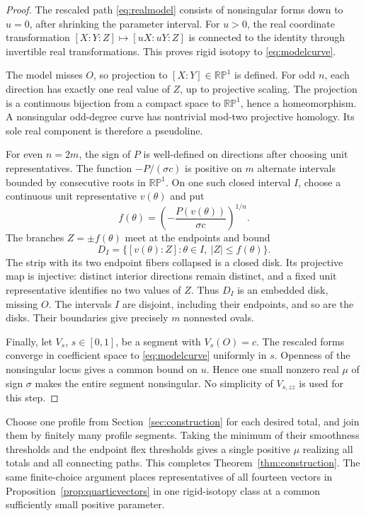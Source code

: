 \documentclass[11pt,a4paper]{article}
\theoremstyle{remark}
\newcommand{\RP}{\mathbb {RP}}
\begin{document}
\begin{proof}
The rescaled path \eqref{eq:realmodel} consists of nonsingular
forms down to \(u=0\), after shrinking the parameter interval.
For \(u>0\), the real coordinate transformation
\([X:Y:Z]\mapsto[uX:uY:Z]\) is connected to the identity through
invertible real transformations. This proves rigid isotopy to
\eqref{eq:modelcurve}.

The model misses \(O\), so projection to \([X:Y]\in\RP^1\)
is defined. For odd \(n\), each direction has exactly one real
value of \(Z\), up to projective scaling. The projection is a
continuous bijection from a compact space to \(\RP^1\), hence a
homeomorphism. A nonsingular odd-degree curve has nontrivial
mod-two projective homology. Its sole real component is therefore
a pseudoline.

For even \(n=2m\), the sign of \(P\) is well-defined on directions
after choosing unit representatives. The function
\(-P/(\sigma c)\) is positive on \(m\) alternate intervals bounded
by consecutive roots in \(\RP^1\). On one such closed interval
\(I\), choose a continuous unit representative \(v(\theta)\) and put
\[
 f(\theta)=\left(-\frac{P(v(\theta))}{\sigma c}\right)^{1/n}.
\]
The branches \(Z=\pm f(\theta)\) meet at the endpoints and bound
\begin{equation}\label{eq:disks}
 D_I=\{[v(\theta):Z]:\theta\in I,\ |Z|\leq f(\theta)\}.
\end{equation}
The strip with its two endpoint fibers collapsed is a closed
disk. Its projective map is injective: distinct interior
directions remain distinct, and a fixed unit representative
identifies no two values of \(Z\). Thus \(D_I\) is an embedded
disk, missing \(O\). The intervals \(I\) are disjoint, including
their endpoints, and so are the disks. Their boundaries give
precisely \(m\) nonnested ovals.

Finally, let \(V_s\), \(s\in[0,1]\), be a segment with
\(V_s(O)=c\). The rescaled forms converge in coefficient space
to \eqref{eq:modelcurve} uniformly in \(s\). Openness of the
nonsingular locus gives a common bound on \(u\).
Hence one small nonzero real \(\mu\) of sign \(\sigma\) makes
the entire segment nonsingular. No simplicity of \(V_{s,zz}\)
is used for this step.
\end{proof}

Choose one profile from Section~\ref{sec:construction} for each
desired total, and join them by finitely many profile segments.
Taking the minimum of their smoothness thresholds and the
endpoint flex thresholds gives a single positive \(\mu\)
realizing all totals and all connecting paths. This completes
Theorem~\ref{thm:construction}. The same finite-choice argument
places representatives of all fourteen vectors in
Proposition~\ref{prop:quarticvectors} in one rigid-isotopy class
at a common sufficiently small positive parameter.
\end{document}
